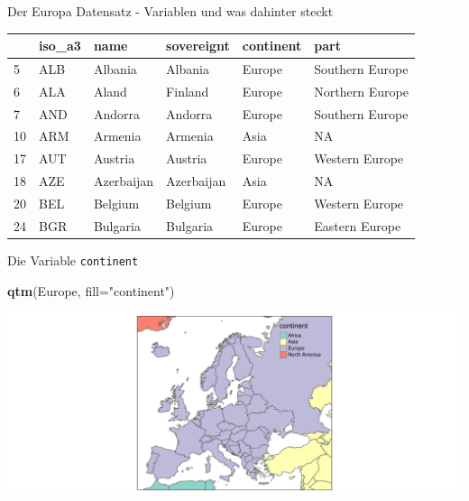 \documentclass[ignorenonframetext,]{beamer}
\newenvironment{Shaded}{\begin{snugshade}}{\end{snugshade}}
\newcommand{\KeywordTok}[1]{\textcolor[rgb]{0.13,0.29,0.53}{\textbf{#1}}}
\newcommand{\DataTypeTok}[1]{\textcolor[rgb]{0.13,0.29,0.53}{#1}}
\newcommand{\StringTok}[1]{\textcolor[rgb]{0.31,0.60,0.02}{#1}}
\newcommand{\NormalTok}[1]{#1}
\begin{document}
\begin{frame}{Der Europa Datensatz - Variablen und was dahinter steckt}

\begin{longtable}[]{@{}llllll@{}}
\toprule
& iso\_a3 & name & sovereignt & continent & part\tabularnewline
\midrule
\endhead
5 & ALB & Albania & Albania & Europe & Southern Europe\tabularnewline
6 & ALA & Aland & Finland & Europe & Northern Europe\tabularnewline
7 & AND & Andorra & Andorra & Europe & Southern Europe\tabularnewline
10 & ARM & Armenia & Armenia & Asia & NA\tabularnewline
17 & AUT & Austria & Austria & Europe & Western Europe\tabularnewline
18 & AZE & Azerbaijan & Azerbaijan & Asia & NA\tabularnewline
20 & BEL & Belgium & Belgium & Europe & Western Europe\tabularnewline
24 & BGR & Bulgaria & Bulgaria & Europe & Eastern Europe\tabularnewline
\bottomrule
\end{longtable}

\end{frame}

\begin{frame}[fragile]{Die Variable \texttt{continent}}

\begin{Shaded}
\begin{Highlighting}[]
\KeywordTok{qtm}\NormalTok{(Europe, }\DataTypeTok{fill=}\StringTok{"continent"}\NormalTok{)}
\end{Highlighting}
\end{Shaded}

\includegraphics{tmap_files/figure-beamer/unnamed-chunk-15-1.pdf}

\end{frame}
\end{document}
